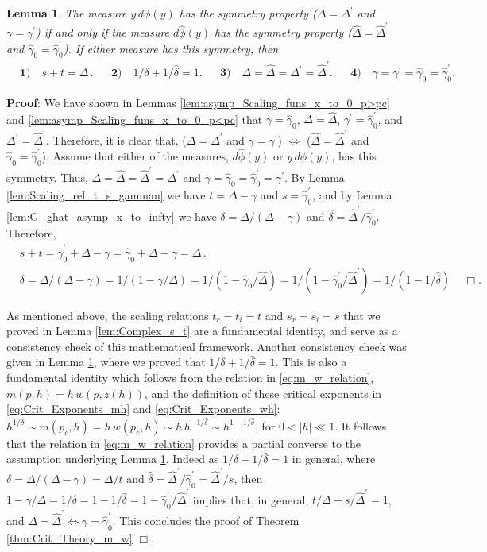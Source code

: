 \documentclass[english,12pt,jmp,graphicx]{revtex4-1}
\newtheorem{lemma}{Lemma}[section]
\newcommand{\ph}{\hat{\phi}}
\newcommand{\gh}{\hat{\gamma}}
\newcommand{\Dh}{\hat{\Delta}}
\newcommand{\dha}{\hat{\delta}}
\begin{document}
\begin{lemma}\label{lem:s_t}
  The measure $y\,d\phi(y)$ has the symmetry property ($\Delta=\Delta^\prime$ and $\gamma=\gamma^\prime$)
  if and only if the measure $d\ph(y)$ has the symmetry property
  ($\Dh=\Dh^\prime$ and $\gh_0=\gh_0^\prime$). If either measure has this symmetry,
  then  
  \begin{align*}    
    &\mathbf{1)} \quad s+t=\Delta\,. &&
    \mathbf{2)} \quad 1/\delta+1/\dha=1.&&
    \mathbf{3)} \quad \Delta=\Dh=\Delta^\prime=\Dh^\prime.&&
    \mathbf{4)} \quad \gamma=\gamma^\prime=\gh_0=\gh_0^\prime.
   \end{align*}
 \end{lemma}
%
\noindent \textbf{Proof}:
%
We have shown in Lemmas
\ref{lem:asymp_Scaling_funs_x_to_0_p>pc} and
\ref{lem:asymp_Scaling_funs_x_to_0_p<pc}  
that $\gamma=\gh_0$, $\Delta=\Dh$, $\gamma^\prime=\gh_0^\prime$, and $\Delta^\prime=\Dh^\prime$. Therefore, it
is clear that, ($\Delta=\Delta^\prime$ and $\gamma=\gamma^\prime$) $\iff$ ($\Dh=\Dh^\prime$ and
$\gh_0=\gh_0^\prime$). Assume that either of the measures, $d\ph(y)$
or $y\,d\phi(y)$, has this symmetry. Thus, $\Delta=\Dh=\Dh^\prime=\Delta^\prime$ and
$\gamma=\gh_0=\gh_0^\prime=\gamma^\prime$. By
Lemma \ref{lem:Scaling_rel_t_s_gamman} we have $t=\Delta-\gamma$ and
$s=\gh_0^\prime$, and by Lemma \ref{lem:G_ghat_asymp_x_to_infty} we have
$\delta=\Delta/(\Delta-\gamma)$ and $\dha=\Dh^\prime/\gh_0^\prime$. Therefore,    
%
\begin{align*}
  &s+t=\gh_0^\prime+\Delta-\gamma=\gh_0+\Delta-\gamma=\Delta\,.\\
  &\delta=\Delta/(\Delta-\gamma)=1/(1-\gamma/\Delta)=1/(1-\gh_0/\Dh)=1/(1-\gh_0^\prime/\Dh^\prime)=1/(1-1/\dha)\,
  \quad \Box.
\end{align*}

As mentioned above, the scaling relations $t_r=t_i=t$ and $s_r=s_i=s$
that we proved in Lemma \ref{lem:Complex_s_t} are a fundamental
identity, and serve as a consistency check of this mathematical
framework. Another consistency check was given in Lemma \ref{lem:s_t},
where we proved that $1/\delta+1/\dha=1$. This is also a fundamental
identity which follows from the relation in \eqref{eq:m_w_relation},
$m(p,h)=h\,w(p,z(h))$, and the definition of these critical exponents
in \eqref{eq:Crit_Exponents_mh} and \eqref{eq:Crit_Exponents_wh}:
$h^{1/\delta}\sim m(p_c,h)=h\,w(p_c,h)\sim h\,h^{-1/\dha}\sim h^{1-1/\dha}$, for
$0<|h|\ll1$. It follows that the relation in \eqref{eq:m_w_relation}
provides a partial converse to the assumption underlying Lemma 
\ref{lem:s_t}. Indeed as $1/\delta+1/\dha=1$ in general, where $\delta=\Delta/(\Delta-\gamma)=\Delta/t$
and $\dha=\Dh^\prime/\gh_0^\prime=\Dh^\prime/s$, then
$1-\gamma/\Delta=1/\delta=1-1/\dha=1-\gh_0^\prime/\Dh^\prime$ implies that, in general,
$t/\Delta+s/\Dh^\prime=1$, and $\Delta=\Dh^\prime\iff\gamma=\gh_0^\prime$. 
%
This concludes the proof of Theorem \ref{thm:Crit_Theory_m_w} $\Box$.
%
%
\end{document}
